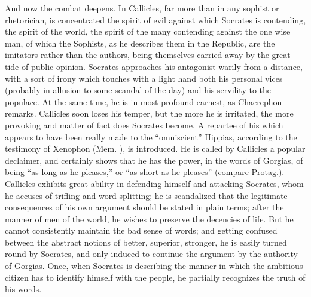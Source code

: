 \documentclass[11pt,letter]{article}
\begin{document}
\par  And now the combat deepens. In Callicles, far more than in any sophist or rhetorician, is concentrated the spirit of evil against which Socrates is contending, the spirit of the world, the spirit of the many contending against the one wise man, of which the Sophists, as he describes them in the Republic, are the imitators rather than the authors, being themselves carried away by the great tide of public opinion. Socrates approaches his antagonist warily from a distance, with a sort of irony which touches with a light hand both his personal vices (probably in allusion to some scandal of the day) and his servility to the populace. At the same time, he is in most profound earnest, as Chaerephon remarks. Callicles soon loses his temper, but the more he is irritated, the more provoking and matter of fact does Socrates become. A repartee of his which appears to have been really made to the “omniscient” Hippias, according to the testimony of Xenophon (Mem. ), is introduced. He is called by Callicles a popular declaimer, and certainly shows that he has the power, in the words of Gorgias, of being “as long as he pleases,” or “as short as he pleases” (compare Protag.). Callicles exhibits great ability in defending himself and attacking Socrates, whom he accuses of trifling and word-splitting; he is scandalized that the legitimate consequences of his own argument should be stated in plain terms; after the manner of men of the world, he wishes to preserve the decencies of life. But he cannot consistently maintain the bad sense of words; and getting confused between the abstract notions of better, superior, stronger, he is easily turned round by Socrates, and only induced to continue the argument by the authority of Gorgias. Once, when Socrates is describing the manner in which the ambitious citizen has to identify himself with the people, he partially recognizes the truth of his words.
\end{document}
